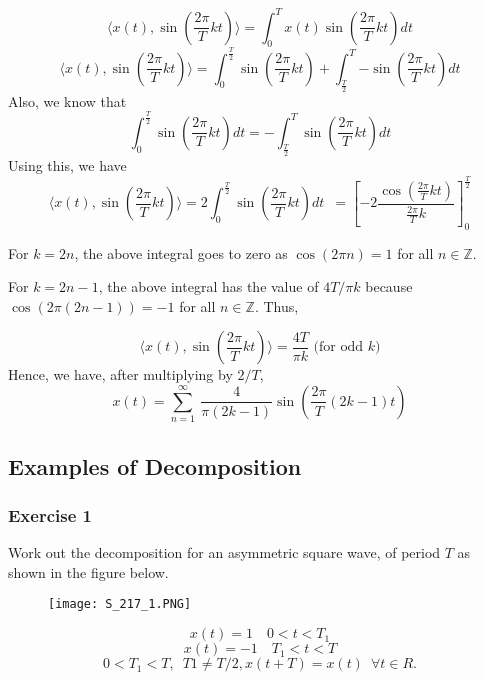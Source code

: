 \begin{equation*} \langle x(t), \sin (\frac{2\pi}{T}kt)\rangle = \int_{0}^{T} x(t)\sin (\frac{2\pi}{T}kt) dt\end{equation*}
\begin{equation*} \langle x(t), \sin (\frac{2\pi}{T}kt)\rangle = \int_{0}^{\frac{T}{2}}\sin (\frac{2\pi}{T}kt) + \int_{\frac{T}{2}}^{T}{-\sin (\frac{2\pi}{T}kt)} dt\end{equation*}
\noindent
Also, we know that 
 \begin{equation*}\int_{0}^{\frac{T}{2}}\sin (\frac{2\pi}{T}kt) dt = -\int_{\frac{T}{2}}^{T}\sin (\frac{2\pi}{T}kt) dt \end{equation*}
\noindent
Using this, we have
\begin{equation*} \langle x(t), \sin (\frac{2\pi}{T}kt)\rangle = 2\int_{0}^{\frac{T}{2}}\sin (\frac{2\pi}{T}kt)dt\enspace = \left[-2\frac{\cos (\frac{2\pi}{T}kt)}{\frac{2\pi}{T}k}\right]_0^\frac{T}{2}\end{equation*}

\noindent
For $k = 2n$, the above integral goes to zero as $\cos ({2\pi}n) = 1$ for all $n \in \mathbb{Z}$.

\noindent
For $k = 2n-1$, the above integral has the value of $4T/\pi k$ because $\cos(2{\pi}(2n-1)) = -1$ for all $n \in \mathbb{Z}$. Thus,

\begin{equation*} \langle x(t), \sin (\frac{2\pi}{T}kt)\rangle = \frac{4T}{{\pi}k} \textrm{ (for odd }k) \end{equation*}
\noindent
Hence, we have, after multiplying by $2/T$,
\begin{equation*} x(t) = \sum_{n=1}^{\infty}\ \frac{4}{{\pi}(2k-1)} \sin (\frac{2\pi}{T}(2k-1)t)\end{equation*} 

\subsection{Examples of Decomposition}
\subsubsection{Exercise 1} 
\noindent
Work out the decomposition for an asymmetric square wave, of period $T$ as shown in the figure below.
\begin{figure}[h!]
\centering
\texttt{[image: S\_217\_1.PNG]}
\end{figure}
 				\begin{equation*} x(t) = 1 \enspace \enspace      0<t<T_1 \end{equation*}
       			\begin{equation*} x(t) = -1  \enspace\enspace 	T_1 < t< T \end{equation*} \begin{equation*}0<T_1<T, \enspace T1\neq T/2, x(t+T) = x(t)\enspace  \forall t\in R.  \end{equation*}

